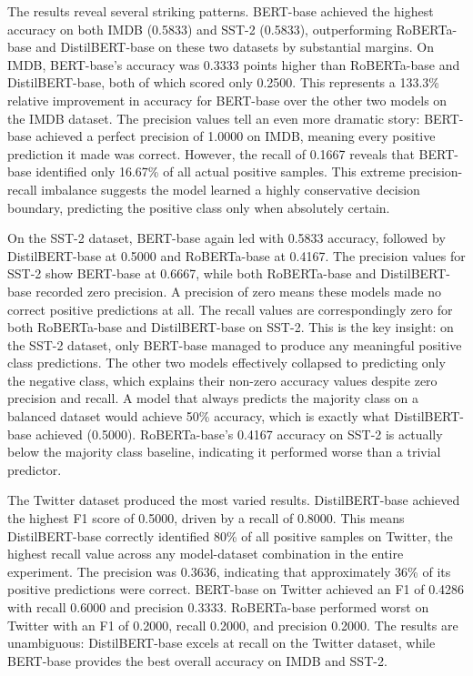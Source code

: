 \documentclass[conference]{IEEEtran}
\begin{document}
The results reveal several striking patterns. BERT-base achieved the highest accuracy on both IMDB (0.5833) and SST-2 (0.5833), outperforming RoBERTa-base and DistilBERT-base on these two datasets by substantial margins. On IMDB, BERT-base's accuracy was 0.3333 points higher than RoBERTa-base and DistilBERT-base, both of which scored only 0.2500. This represents a 133.3\% relative improvement in accuracy for BERT-base over the other two models on the IMDB dataset. The precision values tell an even more dramatic story: BERT-base achieved a perfect precision of 1.0000 on IMDB, meaning every positive prediction it made was correct. However, the recall of 0.1667 reveals that BERT-base identified only 16.67\% of all actual positive samples. This extreme precision-recall imbalance suggests the model learned a highly conservative decision boundary, predicting the positive class only when absolutely certain.

On the SST-2 dataset, BERT-base again led with 0.5833 accuracy, followed by DistilBERT-base at 0.5000 and RoBERTa-base at 0.4167. The precision values for SST-2 show BERT-base at 0.6667, while both RoBERTa-base and DistilBERT-base recorded zero precision. A precision of zero means these models made no correct positive predictions at all. The recall values are correspondingly zero for both RoBERTa-base and DistilBERT-base on SST-2. This is the key insight: on the SST-2 dataset, only BERT-base managed to produce any meaningful positive class predictions. The other two models effectively collapsed to predicting only the negative class, which explains their non-zero accuracy values despite zero precision and recall. A model that always predicts the majority class on a balanced dataset would achieve 50\% accuracy, which is exactly what DistilBERT-base achieved (0.5000). RoBERTa-base's 0.4167 accuracy on SST-2 is actually below the majority class baseline, indicating it performed worse than a trivial predictor.

The Twitter dataset produced the most varied results. DistilBERT-base achieved the highest F1 score of 0.5000, driven by a recall of 0.8000. This means DistilBERT-base correctly identified 80\% of all positive samples on Twitter, the highest recall value across any model-dataset combination in the entire experiment. The precision was 0.3636, indicating that approximately 36\% of its positive predictions were correct. BERT-base on Twitter achieved an F1 of 0.4286 with recall 0.6000 and precision 0.3333. RoBERTa-base performed worst on Twitter with an F1 of 0.2000, recall 0.2000, and precision 0.2000. The results are unambiguous: DistilBERT-base excels at recall on the Twitter dataset, while BERT-base provides the best overall accuracy on IMDB and SST-2.
\end{document}
